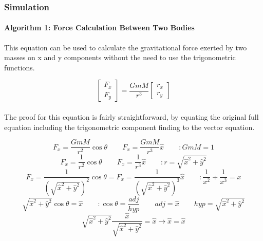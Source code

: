 \subsubsection{Simulation}
\paragraph{Algorithm 1: Force Calculation Between Two Bodies}
This equation can be used to calculate the gravitational force exerted by two masses on x and y components without the need to use the trigonometric functions.

$$\begin{bmatrix} F_x \\ F_y \end{bmatrix} = \frac{GmM}{r^3} \begin{bmatrix} r_x \\ r_y \end{bmatrix}$$

\paragraph{}
The proof for this equation is fairly straightforward, by equating the original full equation including the trigonometric component finding to the vector equation.

$$F_x=\frac{GmM}{r^2}\cos\theta \hspace{25pt} F_x=\frac{GmM}{r^3}\hat{x} \hspace{25pt} : GmM = 1 $$ 
\vspace{10pt}
$$F_x=\frac{1}{r^2}\cos\theta \hspace{25pt} F_x=\frac{1}{r^3}\hat{x} \hspace{25pt} : r=\sqrt{\hat{x}^2+\hat{y}^2}$$ 
\vspace{10pt}
$$F_x=\frac{1}{(\sqrt{\hat{x}^2+\hat{y}^2})^2}\cos\theta = F_x=\frac{1}{(\sqrt{\hat{x}^2+\hat{y}^2})^3}\hat{x} \hspace{25pt} : \frac{1}{x^2} \div \frac{1}{x^3}  = x$$
\vspace{10pt}
$$\sqrt{\hat{x}^2+\hat{y}^2}\cos\theta=\hat{x} \hspace{25pt} : \cos\theta=\frac{adj}{hyp} \hspace{25pt} adj=\hat{x} \hspace{25pt} hyp=\sqrt{\hat{x}^2+\hat{y}^2}$$
\vspace{10pt}
$$\sqrt{\hat{x}^2+\hat{y}^2}\frac{\hat{x}}{\sqrt{\hat{x}^2+\hat{y}^2}}=\hat{x} \rightarrow \hat{x} = \hat{x}$$

